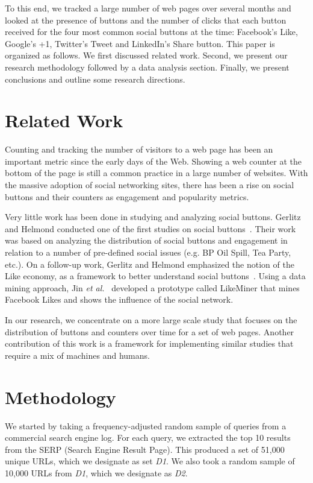 \documentclass{sig-alternate}
\begin{document}
To this end, we tracked a large number of web pages over several months and looked at the presence of buttons and the number of clicks that each button received for the four most common social buttons at the time: Facebook's Like, Google's +1, Twitter's Tweet and LinkedIn's Share button.
This paper is organized as follows. We first discussed related work. Second, we present our research methodology followed by a data analysis section. Finally, we present conclusions and outline some research directions.



\section{Related Work}

Counting and tracking the number of visitors to a web page has been an important metric since the early days of the Web. Showing a web counter at the bottom of the page is still a common practice in a large number of websites. With the massive adoption of social networking sites, there has been a rise on social buttons and their counters as engagement and popularity metrics. 

Very little work has been done in studying and analyzing social buttons.
Gerlitz and Helmond conducted one of the first studies on social buttons~\cite{Gerlitz11}. Their work was based on analyzing the distribution of social buttons and engagement in relation to a number of pre-defined social issues (e.g. BP Oil Spill, Tea Party, etc.). On a follow-up work, Gerlitz and Helmond emphasized the notion of the Like economy, as a framework to better understand social buttons~\cite{Gerlitz13}.  Using a data mining approach, Jin \emph{et al.}~\cite{Jin11} developed a
prototype called LikeMiner  that mines Facebook Likes and shows the influence of the social network.

In our research, we concentrate on a more large scale study that focuses on the distribution of buttons and counters over time for a set of web pages. Another contribution of this work is a framework for implementing similar studies that require a mix of machines and humans.

\section{Methodology}

We started by taking a frequency-adjusted random sample of queries from a commercial search engine log. For each query, we extracted the top 10 results from the SERP (Search Engine Result Page). This produced a set of 51,000 unique URLs, which we designate as set \emph{D1}. We also took a random sample of 10,000 URLs from \emph{D1}, which we designate as \emph{D2}.
\end{document}
